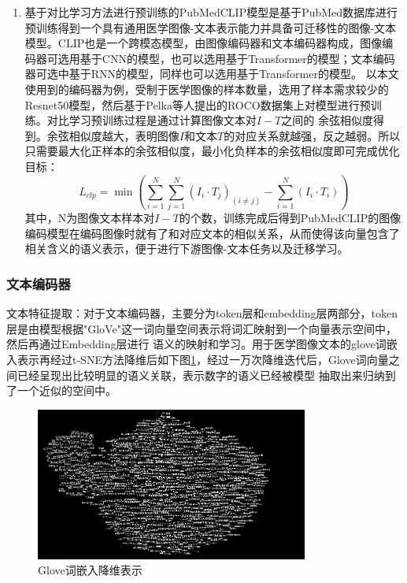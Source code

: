 \begin{enumerate}[topsep = 0 pt, itemsep= 0 pt, parsep=0pt, partopsep=0pt, leftmargin=44pt, itemindent=0pt, labelsep=6pt, label=(\arabic*)]
\item 基于对比学习方法进行预训练的PubMedCLIP模型是基于PubMed数据库进行预训练得到一个具有通用医学图像-文本表示能力并具备可迁移性的图像-文本模型。CLIP也是一个跨模态模型，由图像编码器和文本编码器构成，图像编码器可选用基于CNN的模型，也可以选用基于Transformer的模型；文本编码器可选中基于RNN的模型，同样也可以选用基于Transformer的模型。
以本文使用到的编码器为例，受制于医学图像的样本数量，选用了样本需求较少的Resnet50模型，然后基于Pelka等人提出的ROCO数据集上对模型进行预训练。对比学习预训练过程是通过计算图像文本对$I-T$之间的
余弦相似度得到。余弦相似度越大，表明图像$I$和文本$T$的对应关系就越强，反之越弱。所以只需要最大化正样本的余弦相似度，最小化负样本的余弦相似度即可完成优化目标：
\begin{equation}
	\label{}
	L_{clp}=\min \left(\sum_{i=1}^N \sum_{j=1}^N\left(I_i \cdot T_j\right)_{(i \neq j)}-\sum_{i=1}^N\left(I_i \cdot T_i\right)\right)
\end{equation}
其中，N为图像文本样本对$I-T$的个数，训练完成后得到PubMedCLIP的图像编码模型在编码图像时就有了和对应文本的相似关系，从而使得该向量包含了相关含义的语义表示，便于进行下游图像-文本任务以及迁移学习。
\end{enumerate}

\subsubsection{文本编码器}
文本特征提取：对于文本编码器，主要分为token层和embedding层两部分，token层是由模型根据"GloVe"这一词向量空间表示将词汇映射到一个向量表示空间中，然后再通过Embedding层进行
语义的映射和学习。用于医学图像文本的glove词嵌入表示再经过t-SNE方法降维后如下图\ref{fig:Glove}，经过一万次降维迭代后，Glove词向量之间已经呈现出比较明显的语义关联，表示数字的语义已经被模型
抽取出来归纳到了一个近似的空间中。
\begin{figure}[htbp]
	\centering	
	\includegraphics[width=0.8\textwidth]{Fig/myfig/chapter3/Glove.jpg}  %
	\caption{\label{fig:Glove}Glove词嵌入降维表示} 
\end{figure}

